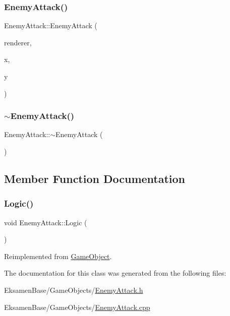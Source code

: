 \subsubsection{\texorpdfstring{Enemy\+Attack()}{EnemyAttack()}}
{\footnotesize\ttfamily Enemy\+Attack\+::\+Enemy\+Attack (\begin{DoxyParamCaption}\item[{S\+D\+L\+\_\+\+Renderer $\ast$}]{renderer,  }\item[{int}]{x,  }\item[{int}]{y }\end{DoxyParamCaption})}

\mbox{\label{class_enemy_attack_abc5fbac33c1c8d61ab70e4a480980c77}} 
\subsubsection{\texorpdfstring{$\sim$\+Enemy\+Attack()}{~EnemyAttack()}}
{\footnotesize\ttfamily Enemy\+Attack\+::$\sim$\+Enemy\+Attack (\begin{DoxyParamCaption}{ }\end{DoxyParamCaption})}



\subsection{Member Function Documentation}
\mbox{\label{class_enemy_attack_a2f735b2cbf13787217a5daed7ff8f7a4}} 
\subsubsection{\texorpdfstring{Logic()}{Logic()}}
{\footnotesize\ttfamily void Enemy\+Attack\+::\+Logic (\begin{DoxyParamCaption}{ }\end{DoxyParamCaption})\hspace{0.3cm}{\ttfamily [virtual]}}



Reimplemented from \mbox{\hyperlink{class_game_object_a79510ffc77339fe850491dce9f580fa9}{Game\+Object}}.



The documentation for this class was generated from the following files\+:\begin{DoxyCompactItemize}
\item 
Eksamen\+Base/\+Game\+Objects/\mbox{\hyperlink{_enemy_attack_8h}{Enemy\+Attack.\+h}}\item 
Eksamen\+Base/\+Game\+Objects/\mbox{\hyperlink{_enemy_attack_8cpp}{Enemy\+Attack.\+cpp}}\end{DoxyCompactItemize}
